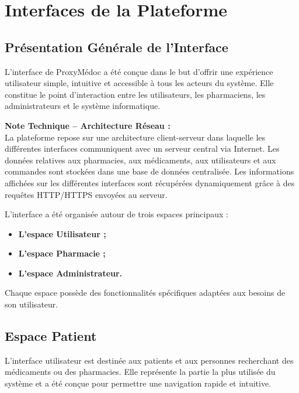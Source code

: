 \documentclass[12pt,a4paper]{report}
\begin{document}
	\chapter{Interfaces de la Plateforme} 
	
	\section{Présentation Générale de l'Interface} 
	L'interface de ProxyMédoc a été conçue dans le but d'offrir une expérience utilisateur simple, intuitive et accessible à tous les acteurs du système. %
	Elle constitue le point d'interaction entre les utilisateurs, les pharmaciens, les administrateurs et le système informatique. %
	\begin{boxreseau} 
		\textbf{Note Technique -- Architecture Réseau :}\\ 
		La plateforme repose sur une architecture client-serveur dans laquelle les différentes interfaces communiquent avec un serveur central via Internet. %
		Les données relatives aux pharmacies, aux médicaments, aux utilisateurs et aux commandes sont stockées dans une base de données centralisée. %
		Les informations affichées sur les différentes interfaces sont récupérées dynamiquement grâce à des requêtes HTTP/HTTPS envoyées au serveur. %
	\end{boxreseau} 
	
	L'interface a été organisée autour de trois espaces principaux : 
	\begin{itemize} 
		\item \textbf{L'espace Utilisateur ;} 
		\item \textbf{L'espace Pharmacie ;} 
		\item \textbf{L'espace Administrateur.} 
	\end{itemize} 
	Chaque espace possède des fonctionnalités spécifiques adaptées aux besoins de son utilisateur. %
	
	\section{Espace Patient} 
	L'interface utilisateur est destinée aux patients et aux personnes recherchant des médicaments ou des pharmacies. %
	Elle représente la partie la plus utilisée du système et a été conçue pour permettre une navigation rapide et intuitive. %
	
\end{document}
